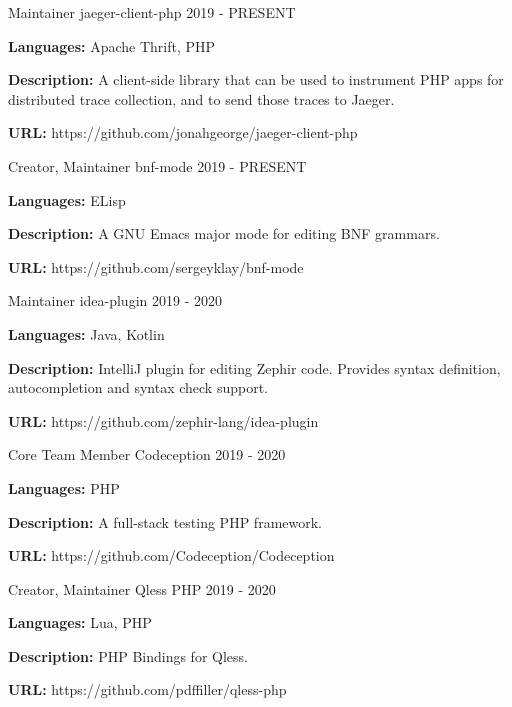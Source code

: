 \begin{cventries}
  \cventry
    {Maintainer}
    {jaeger-client-php}
    {}
    {2019 - PRESENT}
    {
      \begin{cvitems}
        \item {\textbf{Languages:} Apache Thrift, PHP}
        \item {\textbf{Description:} A client-side library that can be used to instrument PHP apps for distributed trace collection, and to send those traces to Jaeger.}
        \item {\textbf{URL:} https://github.com/jonahgeorge/jaeger-client-php}
      \end{cvitems}
    }

  \cventry
    {Creator, Maintainer}
    {bnf-mode}
    {}
    {2019 - PRESENT}
    {
      \begin{cvitems}
        \item {\textbf{Languages:} ELisp}
        \item {\textbf{Description:} A GNU Emacs major mode for editing BNF grammars.}
        \item {\textbf{URL:} https://github.com/sergeyklay/bnf-mode}
      \end{cvitems}
    }

  \cventry
    {Maintainer}
    {idea-plugin}
    {}
    {2019 - 2020}
    {
      \begin{cvitems}
        \item {\textbf{Languages:} Java, Kotlin}
        \item {\textbf{Description:} IntelliJ plugin for editing Zephir code. Provides syntax definition, autocompletion and syntax check support.}
        \item {\textbf{URL:} https://github.com/zephir-lang/idea-plugin}
      \end{cvitems}
    }

  \cventry
    {Core Team Member}
    {Codeception}
    {}
    {2019 - 2020}
    {
      \begin{cvitems}
        \item {\textbf{Languages:} PHP}
        \item {\textbf{Description:} A full-stack testing PHP framework.}
        \item {\textbf{URL:} https://github.com/Codeception/Codeception}
      \end{cvitems}
    }

  \cventry
    {Creator, Maintainer}
    {Qless PHP}
    {}
    {2019 - 2020}
    {
      \begin{cvitems}
        \item {\textbf{Languages:} Lua, PHP}
        \item {\textbf{Description:} PHP Bindings for Qless.}
        \item {\textbf{URL:} https://github.com/pdffiller/qless-php}
      \end{cvitems}
    }


\end{cventries}
